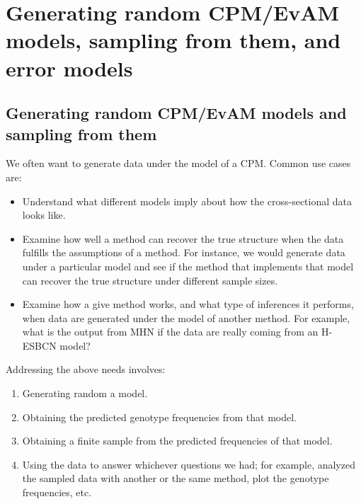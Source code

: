 \documentclass[a4paper,11pt]{article}
\begin{document}
\section{Generating random CPM/EvAM models, sampling from them, and error models}\label{sec:random_evam}


\subsection{Generating random CPM/EvAM models and sampling from them}\label{subsec:random_evam}
We often want to generate data under the model of a CPM. Common use cases are:

\begin{itemize}
\item Understand what different models imply about how the cross-sectional data looks like.

\item Examine how well a method can recover the true structure when the data fulfills the assumptions of a method. For instance, we would generate data under a particular model and see if the method that implements that model can recover the true structure under different sample sizes.

\item Examine how a give method works, and what type of inferences it performs, when data are generated under the model of another method. For example, what is the output from MHN if the data are really coming from an H-ESBCN model?
\end{itemize}


Addressing the above needs involves:


\begin{enumerate}
\item Generating random a model.
 
\item Obtaining the predicted genotype frequencies from that model.
 
\item Obtaining a finite sample from the predicted frequencies of that model.
  
\item Using the data to answer whichever questions we had; for example, analyzed the sampled data with another or the same method, plot the genotype frequencies, etc.
  
\end{enumerate}
\end{document}
